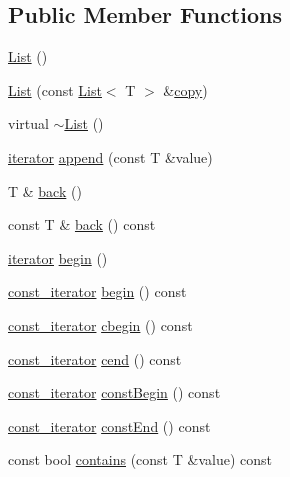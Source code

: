 \subsection*{Public Member Functions}
\begin{DoxyCompactItemize}
\item 
\hyperlink{classprism_1_1_list_af81334fa20cb34b36a40d0ac4c36e2a5}{List} ()
\item 
\hyperlink{classprism_1_1_list_a8f2ff5a39c10ca4f57b5d3794e72cf93}{List} (const \hyperlink{classprism_1_1_list}{List}$<$ T $>$ \&\hyperlink{namespaceprism_ae776f4cd825f79e7af1cf6ee1d90a209}{copy})
\item 
virtual \hyperlink{classprism_1_1_list_aaa8567cc4eb408e62117f1a9782629ba}{$\sim$\+List} ()
\item 
\hyperlink{classprism_1_1_list_a6cf00c98a428ed325fe9ccc60d7ef95a}{iterator} \hyperlink{classprism_1_1_list_a5e6584f87eee4371e308e1aa9c3da6c8}{append} (const T \&value)
\item 
T \& \hyperlink{classprism_1_1_list_a557466129db60dc92eaa68b18012900e}{back} ()
\item 
const T \& \hyperlink{classprism_1_1_list_a6031d94f7c8a88224364523d10a2eff4}{back} () const 
\item 
\hyperlink{classprism_1_1_list_a6cf00c98a428ed325fe9ccc60d7ef95a}{iterator} \hyperlink{classprism_1_1_list_ac86cc19f89e9913ea93f3b212d531954}{begin} ()
\item 
\hyperlink{classprism_1_1_list_a038bd36af263a85110467528db8305d5}{const\+\_\+iterator} \hyperlink{classprism_1_1_list_a9d4e4d463be411b27307dcf3cdc49422}{begin} () const 
\item 
\hyperlink{classprism_1_1_list_a038bd36af263a85110467528db8305d5}{const\+\_\+iterator} \hyperlink{classprism_1_1_list_a55b460a5a5e00aeee87df83e8559349c}{cbegin} () const 
\item 
\hyperlink{classprism_1_1_list_a038bd36af263a85110467528db8305d5}{const\+\_\+iterator} \hyperlink{classprism_1_1_list_a1b526719a7f63a47482ff0b293d36ad1}{cend} () const 
\item 
\hyperlink{classprism_1_1_list_a038bd36af263a85110467528db8305d5}{const\+\_\+iterator} \hyperlink{classprism_1_1_list_a19923a3ef18676b387972dcb78f5a131}{const\+Begin} () const 
\item 
\hyperlink{classprism_1_1_list_a038bd36af263a85110467528db8305d5}{const\+\_\+iterator} \hyperlink{classprism_1_1_list_af8f11fb293ac9961acf72e76c4128473}{const\+End} () const 
\item 
const bool \hyperlink{classprism_1_1_list_a3b6d05cd9d1911861c7a440c291ccc26}{contains} (const T \&value) const 

\end{DoxyCompactItemize}
